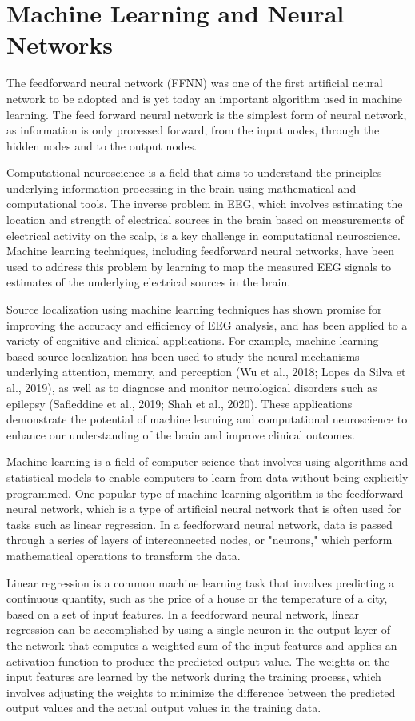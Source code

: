 \documentclass[a4paper, UKenglish, 11pt]{uiomaster}
\begin{document}
\section{Machine Learning and Neural Networks}
The feedforward neural network (FFNN) was one of the first artificial neural network to be adopted and is yet today an important algorithm used in machine learning. The feed forward neural network is the simplest form of neural network, as information is only processed forward, from the input nodes, through the hidden nodes and to the output nodes.

Computational neuroscience is a field that aims to understand the principles underlying information processing in the brain using mathematical and computational tools. The inverse problem in EEG, which involves estimating the location and strength of electrical sources in the brain based on measurements of electrical activity on the scalp, is a key challenge in computational neuroscience. Machine learning techniques, including feedforward neural networks, have been used to address this problem by learning to map the measured EEG signals to estimates of the underlying electrical sources in the brain.

Source localization using machine learning techniques has shown promise for improving the accuracy and efficiency of EEG analysis, and has been applied to a variety of cognitive and clinical applications. For example, machine learning-based source localization has been used to study the neural mechanisms underlying attention, memory, and perception (Wu et al., 2018; Lopes da Silva et al., 2019), as well as to diagnose and monitor neurological disorders such as epilepsy (Safieddine et al., 2019; Shah et al., 2020). These applications demonstrate the potential of machine learning and computational neuroscience to enhance our understanding of the brain and improve clinical outcomes.

Machine learning is a field of computer science that involves using algorithms and statistical models to enable computers to learn from data without being explicitly programmed. One popular type of machine learning algorithm is the feedforward neural network, which is a type of artificial neural network that is often used for tasks such as linear regression. In a feedforward neural network, data is passed through a series of layers of interconnected nodes, or "neurons," which perform mathematical operations to transform the data.

Linear regression is a common machine learning task that involves predicting a continuous quantity, such as the price of a house or the temperature of a city, based on a set of input features. In a feedforward neural network, linear regression can be accomplished by using a single neuron in the output layer of the network that computes a weighted sum of the input features and applies an activation function to produce the predicted output value. The weights on the input features are learned by the network during the training process, which involves adjusting the weights to minimize the difference between the predicted output values and the actual output values in the training data.
\end{document}
